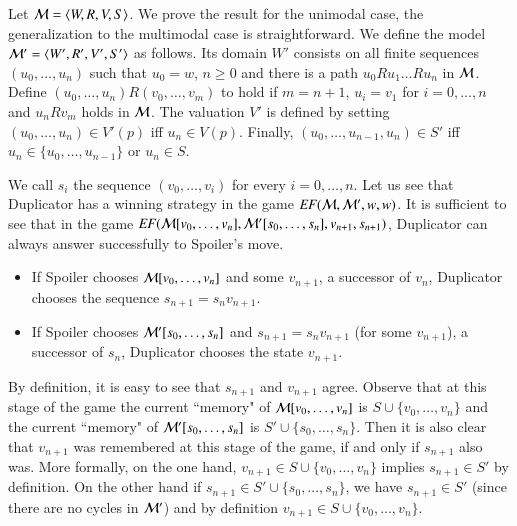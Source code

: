 \begin{pf}
Let $\mathcal{M}=\langle W,R,V,S \rangle$.  We prove the result for the unimodal
case, the generalization to the multimodal case is straightforward.
We define the model $\mathcal{M}'=\langle W',R',V',S' \rangle$ as follows. Its
domain $W'$ consists on all finite sequences $(u_0,\dots,u_n)$ such
that $u_0=w$, $n\geq 0$ and there is a path $u_0Ru_1\dots Ru_n$ in
$\mathcal{M}$. Define $(u_0,\dots,u_n)R(v_0,\dots,v_m)$ to hold if
$m=n+1$, $u_i=v_1$ for $i=0,\dots,n$ and $u_nRv_m$ holds in
$\mathcal{M}$. The valuation $V'$ is defined by setting
$(u_0,\dots,u_n)\in V'(p)$ iff $u_n\in V(p)$. Finally,
$(u_0,\dots,u_{n-1},u_n)\in S'$ iff $u_n\in\{u_0,\dots,u_{n-1}\}$ or
$u_n\in S$.

We call $s_i$ the sequence $(v_0,\dots,v_i)$ for every
$i=0,\dots,n$. Let us see that Duplicator has a winning strategy in
the game $\mathit{EF}(\mathcal{M},\mathcal{M}',w,w)$. It is sufficient to see that in
the game
$\mathit{EF}(\mathcal{M}[v_0,\dots,v_n],\mathcal{M}'[s_0,\dots,s_n],v_{n+1},s_{n+1})$,
Duplicator can always answer successfully to Spoiler's move.
\begin{itemize}
\item
If Spoiler chooses $\mathcal{M}[v_0,\dots,v_n]$ and some $v_{n+1}$, a
successor of $v_n$, Duplicator chooses the sequence
$s_{n+1}=s_nv_{n+1}$.

\item
If Spoiler chooses $\mathcal{M}'[s_0,\dots,s_n]$ and $s_{n+1}=s_nv_{n+1}$
(for some $v_{n+1}$), a successor of $s_n$, Duplicator chooses the
state $v_{n+1}$.
\end{itemize}

By definition, it is easy to see that $s_{n+1}$ and $v_{n+1}$ agree.
Observe that at this stage of the game the current ``memory" of
$\mathcal{M}[v_0,\dots,v_n]$ is $S \cup \{v_0,\dots,v_n\}$ and the
current ``memory" of $\mathcal{M}'[s_0,\dots,s_n]$ is $S' \cup
\{s_0,\dots,s_n\}$. Then it is also clear that $v_{n+1}$ was
remembered at this stage of the game, if and only if $s_{n+1}$ also
was. More formally, on the one hand, $v_{n+1}\in S \cup
\{v_0,\dots,v_n\}$ implies $s_{n+1} \in S'$ by definition. On the
other hand if $s_{n+1}\in S' \cup \{s_0,\dots,s_n\}$, we have
$s_{n+1}\in S'$ (since there are no cycles in $\mathcal{M}'$) and by
definition $v_{n+1}\in S \cup \{v_0,\dots,v_n\}$.
\end{pf}


